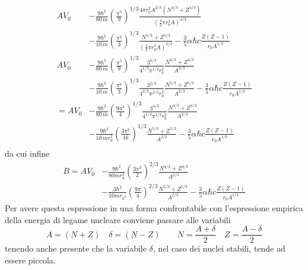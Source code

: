 \begin{align*}
	AV_{0} &- \frac{9 \hbar^{2}}{80 \, m} \left( \frac{\pi^{5}}{9} \right)^{1/3} \frac{4 \pi r_{0}^{2}A^{2/3}(N^{4/3}+Z^{4/3})}{\left( \frac{4}{3} \pi r_{0}^{3} A\right)^{4/3}} \\
	&- \frac{9 \hbar^{2}}{10 \, m} \left( \frac{\pi^{4}}{3} \right)^{1/3} \frac{N^{5/3}+Z^{5/3}}{\left( \frac{4}{3} \pi r_{0}^{3} A\right)^{2/3}} - \frac{3}{5} \alpha \hbar c \frac{Z(Z-1)}{r_{0}A^{1/3}} \\
	AV_{0} &- \frac{9 \hbar^{2}}{80 \, m} \left( \frac{\pi^{5}}{9} \right)^{1/3} \frac{3^{4/3}}{ 4^{1/3}\pi^{1/3}r_{0}^{2}} \frac{N^{4/3}+Z^{4/3}}{A^{2/3}} \\
	&- \frac{9 \hbar^{2}}{10 \, m} \left( \frac{\pi^{4}}{3} \right)^{1/3} \frac{3^{2/3}}{ 4^{2/3}\pi^{2/3}r_{0}^{2}}\frac{N^{5/3}+Z^{5/3}}{ A^{2/3}} - \frac{3}{5} \alpha \hbar c \frac{Z(Z-1)}{r_{0}A^{1/3}} \\
	= AV_{0} &- \frac{9 \hbar^{2}}{80 \, m} \left( \frac{9\pi^{4}}{4} \right)^{1/3} \frac{3^{4/3}}{ 4^{1/3}\pi^{1/3}r_{0}^{2}} \frac{N^{4/3}+Z^{4/3}}{A^{2/3}} \\
	&- \frac{9 \hbar^{2}}{10 \, mr_{0}^{2}} \left( \frac{3\pi^{2}}{16} \right)^{1/3} \frac{N^{5/3}+Z^{5/3}}{ A^{2/3}} - \frac{3}{5} \alpha \hbar c \frac{Z(Z-1)}{r_{0}A^{1/3}} \\
\end{align*}
da cui infine
\begin{align}
	B = A V_{0} &- \frac{9\hbar^{2}}{80 mr_{0}^{2}} \left( \frac{3\pi^{2}}{2} \right)^{2/3}\frac{N^{4/3}+Z^{4/3}}{A^{2/3}} \nonumber\\
	&- \frac{3\hbar^{2}}{10 mr_{0^{2}}}\left( \frac{9\pi}{4} \right)^{2/3} \frac{N^{5/3}+Z^{5/3}}{A^{2/3}} - \frac{3}{5} \alpha \hbar c \frac{Z(Z-1)}{r_{0}A^{1/3}}
	\label{eq:intermediate-calc-binding-energy-fermi-gas}
\end{align}
Per avere questa espressione in una forma confrontabile con l’espressione empirica della energia di legame nucleare conviene passare alle variabili
\[
A=(N+Z) \quad\delta = (N-Z) \qquad N = \frac{A+\delta}{2} \quad Z = \frac{A- \delta}{2}
\]
tenendo anche presente che la variabile $\delta$, nel caso dei nuclei stabili, tende ad essere piccola.

